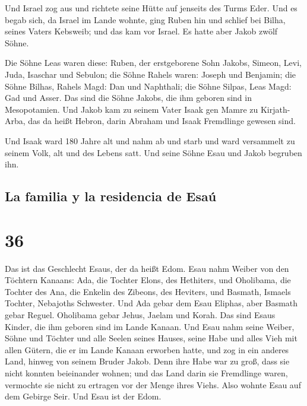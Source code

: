 Und Israel zog aus und richtete seine Hütte auf jenseits
des Turms Eder.  Und es begab sich, da Israel im Lande
wohnte, ging Ruben hin und schlief bei Bilha, seines Vaters Kebsweib;
und das kam vor Israel. Es hatte aber Jakob zwölf Söhne.

 Die Söhne Leas waren diese: Ruben, der erstgeborene Sohn
Jakobs, Simeon, Levi, Juda, Isaschar und Sebulon;  die
Söhne Rahels waren: Joseph und Benjamin;  die Söhne
Bilhas, Rahels Magd: Dan und Naphthali;  die Söhne
Silpas, Leas Magd: Gad und Asser. Das sind die Söhne Jakobs, die ihm
geboren sind in Mesopotamien.  Und Jakob kam zu seinem
Vater Isaak gen Mamre zu Kirjath-Arba, das da heißt Hebron, darin
Abraham und Isaak Fremdlinge gewesen sind.

 Und Isaak ward 180 Jahre alt  und nahm ab
und starb und ward versammelt zu seinem Volk, alt und des Lebens satt.
Und seine Söhne Esau und Jakob begruben ihn.

\hypertarget{la-familia-y-la-residencia-de-esauxfa}{%
\subsection{La familia y la residencia de
Esaú}\label{la-familia-y-la-residencia-de-esauxfa}}

\hypertarget{section-35}{%
\section{36}\label{section-35}}

 Das ist das Geschlecht Esaus, der da heißt Edom.
 Esau nahm Weiber von den Töchtern Kanaans: Ada, die
Tochter Elons, des Hethiters, und Oholibama, die Tochter des Ana, die
Enkelin des Zibeons, des Heviters,  und Basmath, Ismaels
Tochter, Nebajoths Schwester.  Und Ada gebar dem Esau
Eliphas, aber Basmath gebar Reguel.  Oholibama gebar
Jehus, Jaelam und Korah. Das sind Esaus Kinder, die ihm geboren sind im
Lande Kanaan.  Und Esau nahm seine Weiber, Söhne und
Töchter und alle Seelen seines Hauses, seine Habe und alles Vieh mit
allen Gütern, die er im Lande Kanaan erworben hatte, und zog in ein
anderes Land, hinweg von seinem Bruder Jakob.  Denn ihre
Habe war zu groß, dass sie nicht konnten beieinander wohnen; und das
Land darin sie Fremdlinge waren, vermochte sie nicht zu ertragen vor der
Menge ihres Viehs.  Also wohnte Esau auf dem Gebirge Seir.
Und Esau ist der Edom.

